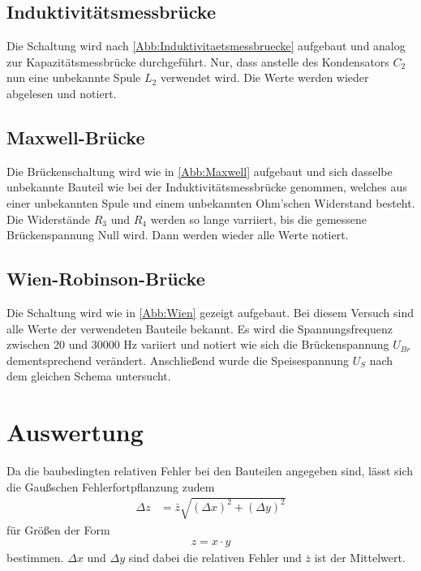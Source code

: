 \documentclass[
  bibliography=totoc,     %
  captions=tableheading,  %
  titlepage=firstiscover, %
]{scrartcl}
\begin{document}
  \subsection{Induktivitätsmessbrücke}

  Die Schaltung wird nach \autoref{Abb:Induktivitaetsmessbruecke} aufgebaut und analog zur Kapazitätsmessbrücke durchgeführt. Nur, dass
  anstelle des Kondensators $C_2$ nun eine unbekannte Spule $L_2$ verwendet wird. Die Werte werden wieder abgelesen und notiert.

  \subsection{Maxwell-Brücke}

  Die Brückenschaltung wird wie in \autoref{Abb:Maxwell} aufgebaut und sich dasselbe unbekannte Bauteil wie bei der Induktivitätsmessbrücke genommen,
  welches aus einer unbekannten Spule und einem unbekannten Ohm'schen Widerstand besteht. Die Widerstände $R_3$ und $R_4$ werden so lange varriiert, 
  bis die gemessene Brückenspannung Null wird. Dann werden wieder alle Werte notiert.

  \subsection{Wien-Robinson-Brücke}

  Die Schaltung wird wie in \autoref{Abb:Wien} gezeigt aufgebaut. Bei diesem Versuch sind alle Werte der verwendeten Bauteile
  bekannt. Es wird die Spannungsfrequenz zwischen 20 und 30000 Hz variiert und notiert wie sich die Brückenspannung $U_{Br}$
  dementsprechend verändert. Anschließend wurde die Speisespannung $U_S$ nach dem gleichen Schema untersucht.

  \newpage
  \section{Auswertung}
  
  Da die baubedingten relativen Fehler bei den Bauteilen angegeben sind, lässt sich die Gaußschen Fehlerfortpflanzung zudem
  \begin{align}
    \Delta z &= \bar{z}\sqrt{(\Delta x)^2 + (\Delta y)^2}
  \end{align}
  für Größen der Form
  \begin{align}
    z = x \cdot y
  \end{align}
  bestimmen. $\Delta x$ und $\Delta y$ sind dabei die relativen Fehler und $\bar{z}$ ist der Mittelwert.
\end{document}
